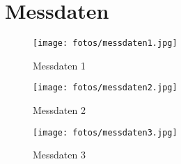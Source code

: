 \section{Messdaten}\label{Messdaten}

\begin{figure}[H]
    \texttt{[image: fotos/messdaten1.jpg]}
    \caption{Messdaten 1}
\end{figure}

\begin{figure}[H]
    \texttt{[image: fotos/messdaten2.jpg]}
    \caption{Messdaten 2}
\end{figure}

\begin{figure}[H]
    \texttt{[image: fotos/messdaten3.jpg]}
    \caption{Messdaten 3}
\end{figure}